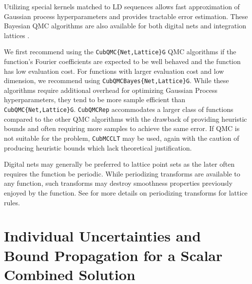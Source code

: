 \documentclass[graybox]{svmult}
\begin{document}
\begin{description}
    Utilizing special kernels matched to LD sequences allows fast approximation of Gaussian process hyperparameters and provides tractable error estimation. These Bayesian QMC algorithms are also available for both digital nets \cite{cubqmcbayes_thesis} and integration lattices  \cite{cubqmcbayeslattice}. 
\end{description}

We first recommend using the  \texttt{CubQMC\{Net,Lattice\}G} QMC algorithms if the function's Fourier coefficients are expected to be well behaved and the function has low evaluation cost. For functions with larger evaluation cost and low dimension, we recommend using  \texttt{CubQMCBayes\{Net,Lattice\}G}. While these algorithms require additional overhead for optimizing Gaussian Process hyperparameters, they tend to be more sample efficient than \texttt{CubQMC\{Net,Lattice\}G}. \texttt{CubQMCRep} accommodates a larger class of functions compared to the other QMC algorithms with the drawback of providing heuristic bounds and often requiring more samples to achieve the same error. If QMC is not suitable for the problem, \texttt{CubMCCLT} may be used, again with the caution of producing heuristic bounds which lack theoretical justification.

Digital nets may generally be preferred to lattice point sets as the later often requires the function be periodic. While periodizing transforms are available to any function, such transforms may destroy smoothness properties previously enjoyed by the function. See \cite[Chapter 16]{mcbook} for more details on periodizing transforms for lattice rules.

\section{Individual Uncertainties and Bound Propagation for a Scalar Combined Solution} \label{sec:comb_sol_approx}
\end{document}

